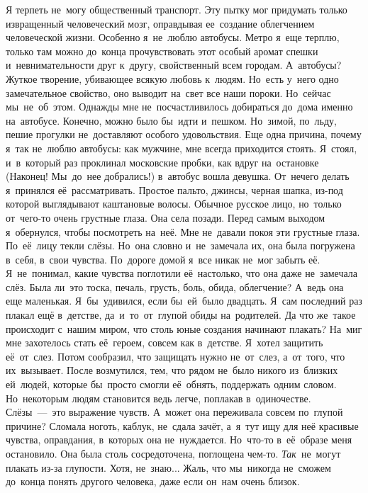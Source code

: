 \clearpage
\chaps{***} 
\lettrine[lines=3, loversize=0.1]{Я}{} терпеть не~могу общественный транспорт.
Эту пытку мог придумать только извращенный человеческий мозг, оправдывая ее~создание облегчением человеческой жизни.
Особенно я~не~люблю автобусы.
Метро я~еще терплю, только там можно до~конца прочувствовать этот особый аромат спешки и~невнимательности друг к~другу, свойственный всем городам.
А~автобусы? Жуткое творение, убивающее всякую любовь к~людям.
Но~есть у~него одно замечательное свойство, оно выводит на~свет все наши пороки.
Но~сейчас мы~не~об~этом.
Однажды мне не~посчастливилось добираться до~дома именно на~автобусе.
Конечно, можно было бы~идти и~пешком.
Но~зимой, по~льду, пешие прогулки не~доставляют особого удовольствия.
Еще одна причина, почему я~так не~люблю автобусы: как мужчине, мне всегда приходится стоять.
Я~стоял, и~в~который раз проклинал московские пробки, как вдруг на~остановке (Наконец! Мы~до~нее добрались!) в~автобус вошла девушка.
От~нечего делать я~принялся её~рассматривать.
Простое пальто, джинсы, черная шапка, из-под которой выглядывают каштановые волосы.
Обычное русское лицо, но~только от~чего-то очень грустные глаза.
Она села позади.
Перед самым выходом я~обернулся, чтобы посмотреть на~неё.
Мне не~давали покоя эти грустные глаза.
По~её~лицу текли слёзы.
Но~она словно и~не~замечала их, она была погружена в~себя, в~свои чувства.
По~дороге домой я~все никак не~мог забыть её.
Я~не~понимал, какие чувства поглотили её~настолько, что она даже не~замечала слёз.
Была ли~это тоска, печаль, грусть, боль, обида, облегчение? А~ведь она еще маленькая.
Я~бы~удивился, если бы~ей~было двадцать.
Я~сам последний раз плакал ещё в~детстве, да~и~то~от~глупой обиды на~родителей.
Да что же~такое происходит с~нашим миром, что столь юные создания начинают плакать?
На~миг мне захотелось стать её~героем, совсем как в~детстве.
Я~хотел защитить её~от~слез.
Потом сообразил, что защищать нужно не~от~слез, а~от~того, что их~вызывает.
После возмутился, тем, что рядом не~было никого из~близких ей~людей, которые бы~просто смогли её~обнять, поддержать одним словом.
Но~некоторым людям становится ведь легче, поплакав в~одиночестве.
Слёзы~---~это выражение чувств.
А~может она переживала совсем по~глупой причине? Сломала ноготь, каблук, не~сдала зачёт, а~я~тут ищу для неё красивые чувства, оправдания, в~которых она не~нуждается.
Но~что-то в~её~образе меня остановило.
Она была столь сосредоточена, поглощена чем-то.
\textit{Так}~не~могут плакать из-за глупости.
Хотя, не~знаю... Жаль, что мы~никогда не~сможем до~конца понять другого человека, даже если он~нам очень близок.
 

